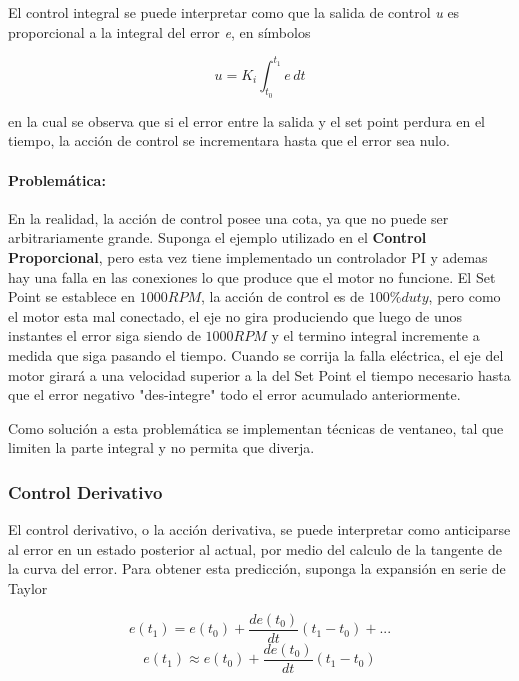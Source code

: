 \documentclass[10pt,conference,a4paper,onecolumn]{article}%
\begin{document}
El control integral se puede interpretar como que la salida de control \textit{u} es proporcional a la integral del error \textit{e}, en símbolos


\begin{equation}
u=K_i \int_{t_0}^{t_1} e \,dt 
\label{eq:control_integral}
\end{equation}


en la cual se observa que si el error entre la salida y el set point perdura en el tiempo, la acción de control se incrementara hasta que el error sea nulo.

\paragraph{Problemática:} En la realidad, la acción de control posee una cota, ya que no puede ser arbitrariamente grande. 
Suponga el ejemplo utilizado en el \textbf{Control Proporcional}, pero esta vez tiene implementado un controlador PI y ademas hay una falla en las conexiones lo que produce que el motor no funcione. El Set Point se establece en $1000RPM$, la acción de control es de $100\%duty$, pero como el motor esta mal conectado, el eje no gira produciendo que luego de unos instantes el error siga siendo de  $1000RPM$ y el termino integral incremente a medida que siga pasando el tiempo. Cuando se corrija la falla eléctrica, el eje del motor girará a una velocidad superior a la del Set Point el tiempo necesario hasta que el error negativo "des-integre" todo el error acumulado anteriormente.

Como solución a esta problemática se implementan técnicas de ventaneo, tal que limiten la parte integral y no permita que diverja.  



\subsubsection{Control Derivativo}
El control derivativo, o la acción derivativa, se puede interpretar como anticiparse al error en un estado posterior al actual, por medio del calculo de la tangente de la curva del error. Para obtener esta predicción, suponga la expansión en serie de Taylor


\begin{equation*}
e(t_1)=e(t_0)+\frac{de(t_0)}{dt}(t_1-t_0)+... 
\end{equation*}
\begin{equation}
 e(t_1) \approx e(t_0)+\frac{de(t_0)}{dt}(t_1-t_0)
\end{equation}
\end{document}
